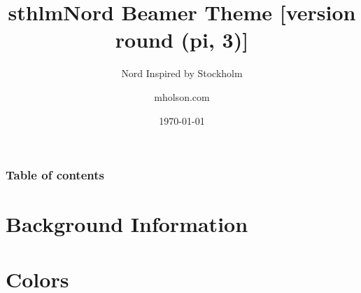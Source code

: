 \documentclass[aspectratio=169, sectionpages, codehl, bibref]{beamer}
\title{sthlmNord Beamer Theme [version round (pi, 3)]}
\subtitle{Nord Inspired by Stockholm}
\author{mholson.com}
\institute{School in Stockholm}
\date{\today}
\begin{document}
\titlepage


\begin{frame}
	\frametitle{Table of contents}
	\tableofcontents
\end{frame}

\section{Background Information}









\section{Colors}





\end{document}
